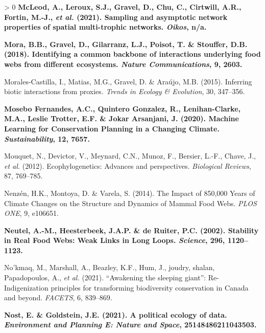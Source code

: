 \documentclass[11pt]{article}
\makeatletter
\def\maxwidth{\ifdim\Gin@nat@width>\linewidth\linewidth
\else\Gin@nat@width\fi}
\let\Oldincludegraphics\includegraphics
\renewcommand{\includegraphics}[1]{\Oldincludegraphics[width=\maxwidth]{#1}}
\newlength{\cslhangindent}
\newenvironment{CSLReferences}[3] %
 {%
  \setlength{\parindent}{0pt}
  \ifodd #1 \everypar{\setlength{\hangindent}{\cslhangindent}}\ignorespaces\fi
  \ifnum #2 > 0
  \setlength{\parskip}{#2\baselineskip}
  \fi
 }%
 {}
\providecommand{\DIFaddtex}[1]{{\bf #1}} %
\providecommand{\DIFaddbegin}{\protect\color{blue}} %
\providecommand{\DIFaddend}{\protect\color{black}} %
\providecommand{\DIFadd}[1]{\texorpdfstring{\DIFaddtex{#1}}{#1}} %
\newcommand{\DIFaddincludegraphics}[2][]{{\color{blue}\fbox{\DIFOincludegraphics[#1]{#2}}}} %
\DeclareRobustCommand{\DIFaddbegin}{\DIFOaddbegin \let\includegraphics\DIFaddincludegraphics} %
\DeclareRobustCommand{\DIFaddend}{\DIFOaddend \let\includegraphics\DIFOincludegraphics} %
\makeatother
\begin{document}
\begin{CSLReferences}{1}{0}
\leavevmode\DIFaddbegin \hypertarget{ref-McLeod2021SamAsy}{}%
\DIFadd{McLeod, A., Leroux, S.J., Gravel, D., Chu, C., Cirtwill, A.R., Fortin,
M.-J., \emph{et al.} (2021). Sampling and asymptotic network properties
of spatial multi-trophic networks. \emph{Oikos}, n/a.
}

\leavevmode\hypertarget{ref-Mora2018IdeCom}{}%
\DIFadd{Mora, B.B., Gravel, D., Gilarranz, L.J., Poisot, T. \& Stouffer, D.B.
(2018). Identifying a common backbone of interactions underlying food
webs from different ecosystems. \emph{Nature Communications}, 9, 2603.
}

\leavevmode\DIFaddend \hypertarget{ref-Morales-Castilla2015InfBio}{}%
Morales-Castilla, I., Matias, M.G., Gravel, D. \& Araújo, M.B. (2015).
Inferring biotic interactions from proxies. \emph{Trends in Ecology \&
Evolution}, 30, 347--356.

\leavevmode\DIFaddbegin \hypertarget{ref-MoseboFernandes2020MacLea}{}%
\DIFadd{Mosebo Fernandes, A.C., Quintero Gonzalez, R., Lenihan-Clarke, M.A.,
Leslie Trotter, E.F. \& Jokar Arsanjani, J. (2020). Machine Learning for
Conservation Planning in a Changing Climate. \emph{Sustainability}, 12,
7657.
}

\leavevmode\DIFaddend \hypertarget{ref-Mouquet2012EcoAdv}{}%
Mouquet, N., Devictor, V., Meynard, C.N., Munoz, F., Bersier, L.-F.,
Chave, J., \emph{et al.} (2012). Ecophylogenetics: Advances and
perspectives. \emph{Biological Reviews}, 87, 769--785.

\leavevmode\hypertarget{ref-Nenzen2014Imp850}{}%
Nenzén, H.K., Montoya, D. \& Varela, S. (2014). The Impact of 850,000
Years of Climate Changes on the Structure and Dynamics of Mammal Food
Webs. \emph{PLOS ONE}, 9, e106651.

\leavevmode\DIFaddbegin \hypertarget{ref-Neutel2002StaRea}{}%
\DIFadd{Neutel, A.-M., Heesterbeek, J.A.P. \& de Ruiter, P.C. (2002). Stability
in Real Food Webs: Weak Links in Long Loops. \emph{Science}, 296,
1120--1123.
}

\leavevmode\DIFaddend \hypertarget{ref-Nokmaq2021AwaSle}{}%
No'kmaq, M., Marshall, A., Beazley, K.F., Hum, J., joudry, shalan,
Papadopoulos, A., \emph{et al.} (2021). {``Awakening the sleeping
giant''}: Re-Indigenization principles for transforming biodiversity
conservation in Canada and beyond. \emph{FACETS}, 6, 839--869.

\leavevmode\DIFaddbegin \hypertarget{ref-Nost2021PolEco}{}%
\DIFadd{Nost, E. \& Goldstein, J.E. (2021). A political ecology of data.
\emph{Environment and Planning E: Nature and Space}, 25148486211043503.
}


\end{CSLReferences}
\end{document}
